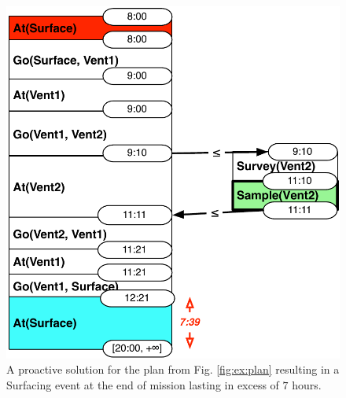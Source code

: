 

\begin{figure}
  \centering
  \includegraphics[width=0.65\columnwidth]{figs/example_early}
  \vskip-3mm
  \caption{\small A proactive solution for the plan from
    Fig. \ref{fig:ex:plan} resulting in a Surfacing event at the end
    of mission lasting in excess of $7$ hours.}
  \label{fig:ex:proactive}
  \vskip-5mm
\end{figure}

